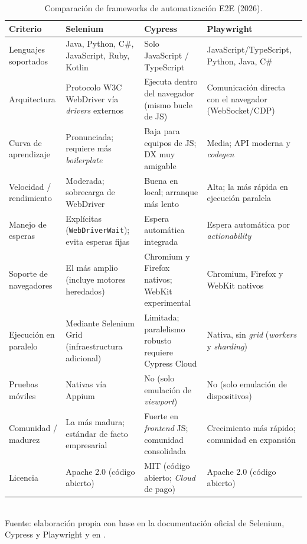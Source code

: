 \documentclass[12pt,a4paper]{article}
\begin{document}
\begin{table}[htbp]
\centering
\footnotesize
\caption{Comparación de frameworks de automatización E2E (2026).}
\label{tab:e2e}
\renewcommand{\arraystretch}{1.25}
\begin{tabularx}{\textwidth}{>{\RaggedRight\arraybackslash}p{}
                             >{\RaggedRight\arraybackslash}X
                             >{\RaggedRight\arraybackslash}X
                             >{\RaggedRight\arraybackslash}X}
\toprule
\textbf{Criterio} & \textbf{Selenium} & \textbf{Cypress} & \textbf{Playwright} \\
\midrule
Lenguajes soportados &
Java, Python, C\#, JavaScript, Ruby, Kotlin &
Solo JavaScript / TypeScript &
JavaScript/TypeScript, Python, Java, C\# \\

Arquitectura &
Protocolo W3C WebDriver vía \textit{drivers} externos &
Ejecuta dentro del navegador (mismo bucle de JS) &
Comunicación directa con el navegador (WebSocket/CDP) \\

Curva de aprendizaje &
Pronunciada; requiere más \textit{boilerplate} &
Baja para equipos de JS; DX muy amigable &
Media; API moderna y \textit{codegen} \\

Velocidad / rendimiento &
Moderada; sobrecarga de WebDriver &
Buena en local; arranque más lento &
Alta; la más rápida en ejecución paralela \\

Manejo de esperas &
Explícitas (\texttt{WebDriverWait}); evita esperas fijas &
Espera automática integrada &
Espera automática por \textit{actionability} \\

Soporte de navegadores &
El más amplio (incluye motores heredados) &
Chromium y Firefox nativos; WebKit experimental &
Chromium, Firefox y WebKit nativos \\

Ejecución en paralelo &
Mediante Selenium Grid (infraestructura adicional) &
Limitada; paralelismo robusto requiere Cypress Cloud &
Nativa, sin \textit{grid} (\textit{workers} y \textit{sharding}) \\

Pruebas móviles &
Nativas vía Appium &
No (solo emulación de \textit{viewport}) &
No (solo emulación de dispositivos) \\

Comunidad / madurez &
La más madura; estándar de facto empresarial &
Fuerte en \textit{frontend} JS; comunidad consolidada &
Crecimiento más rápido; comunidad en expansión \\

Licencia &
Apache 2.0 (código abierto) &
MIT (código abierto; \textit{Cloud} de pago) &
Apache 2.0 (código abierto) \\
\bottomrule
\end{tabularx}
\\[2pt]
{\footnotesize Fuente: elaboración propia con base en la documentación oficial de
Selenium, Cypress y Playwright \citep{seleniumdocs, cypressdocs, playwrightdocs} y
en \citet{garcia2022}.}
\end{table}
\end{document}
